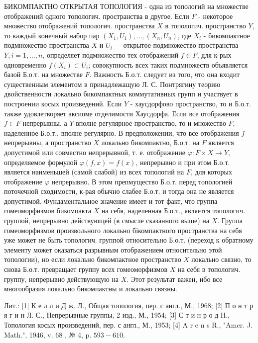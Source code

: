 \documentclass[10pt]{article}
\begin{document}
БИКОМПАКТНО ОТКРЫТАЯ ТОПОЛОГИЯ - одна из топологий на множестве отображений одного топологич. пространства в другое. Если $F$ - некоторое множество отображений топологич. пространства $X$ в топологич. пространство $Y$, то каждый конечный набор пар $\left(X_{1}, U_{1}\right), \ldots,\left(X_{n}, U_{n}\right)$, где $X_{i}$ - бикомпактное подмножество пространства $X$ и $U_{i}-$ открытое подмножество пространства $Y, i=1, \ldots, n$, определяет подмножество тех отображений $f \in F$, для к-рых одновременно $f\left(X_{i}\right) \subset U_{i}$; совокупность всех таких подмножеств объявляется базой Б.о.т. на множестве $F$. Важность Б.о.т. следует из того, что она входит существенным элементом в принадлежащую Л. С. Понтрягину теорию двойственности локально бикомпактных коммутативных групп и участвует в построении косых произведений. Если $Y$ - хаусдорфово пространство, то и Б.о.т. также удовлетворяет аксиоме отделимости Хаусдорфа. Если все отображения $f \in F$ непрерывны, а $Y$-вполне регулярное пространство, то и множество $F$, наделенное Б.о.т., вполне регулярно. В предположении, что все отображения $f$ непрерывны, а пространство $X$ локально бикомпактно, Б.о.т. на $F$ является допустимой или совместно непрерывной, т. е. отображение $\varphi: F \times X \rightarrow Y$, определяемое формулой $\varphi(f, x)=f(x)$, непрерывно и при этом Б.о.т. является наименьшей (самой слабой) из всех топологий на $F$, для которых отображение $\varphi$ непрерывно. В этом препмущество Б.о.т. перед топологией поточечной сходимости, к-рая обычно слабее Б.о.т. и тогда она не является допустимой. Фундаментальное значение имеет и тот факт, что группа гомеоморфизмов бикомпакта $X$ на себя, наделенная Б.о.т., является топологич. группой, непрерывно действующей (в смысле сказанного выше) на $X$. Группа гомеоморфизмов произвольного локально бікомпактного пространства на себя уже может не быть топологич. группой относительно Б.о.т. (переход к обратному элементу может оказаться разрывным отображением относительно этой топологии), но если локально бикомпактное пространство $X$ локально связно, то снова Б.о.т. превращает группу всех гомеоморфизмов $X$ на себя в топологич. группу, непрерывно действующую на $X$. Этот результат важен, ибо все многообразия локально бикомпактны и локально связны.



Лит.: [1] К е л л и Д ж. Л., Общая топология, пер. с англ., М., 1968; [2] П о н т р я г и н Л. С., Непрерывные группы, 2 изд., М., 1954; [3] С т и н р о д Н., Топология косых произведений, пер. с англ., М., 1953; [4] A r e n s R., "Amer. J. Math.", 1946, v. 68 , № 4, p. $593-610$.
\end{document}
